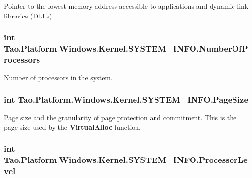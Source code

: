 Pointer to the lowest memory address accessible to applications and dynamic-\/link libraries (DLLs). 

\hypertarget{struct_tao_1_1_platform_1_1_windows_1_1_kernel_1_1_s_y_s_t_e_m___i_n_f_o_a0ac7829baa6c9870245d5ce59d539356}{
\subsubsection[{NumberOfProcessors}]{\setlength{\rightskip}{0pt plus 5cm}int {\bf Tao.Platform.Windows.Kernel.SYSTEM\_\-INFO.NumberOfProcessors}}}
\label{struct_tao_1_1_platform_1_1_windows_1_1_kernel_1_1_s_y_s_t_e_m___i_n_f_o_a0ac7829baa6c9870245d5ce59d539356}


Number of processors in the system. 

\hypertarget{struct_tao_1_1_platform_1_1_windows_1_1_kernel_1_1_s_y_s_t_e_m___i_n_f_o_a5c72c40ccfdf4070f7ed58033db8c892}{
\subsubsection[{PageSize}]{\setlength{\rightskip}{0pt plus 5cm}int {\bf Tao.Platform.Windows.Kernel.SYSTEM\_\-INFO.PageSize}}}
\label{struct_tao_1_1_platform_1_1_windows_1_1_kernel_1_1_s_y_s_t_e_m___i_n_f_o_a5c72c40ccfdf4070f7ed58033db8c892}


Page size and the granularity of page protection and commitment. This is the page size used by the {\bfseries VirtualAlloc} function. 

\hypertarget{struct_tao_1_1_platform_1_1_windows_1_1_kernel_1_1_s_y_s_t_e_m___i_n_f_o_a52a0d3b28f7fc40b45377a30f13ebebe}{
\subsubsection[{ProcessorLevel}]{\setlength{\rightskip}{0pt plus 5cm}int {\bf Tao.Platform.Windows.Kernel.SYSTEM\_\-INFO.ProcessorLevel}}}
\label{struct_tao_1_1_platform_1_1_windows_1_1_kernel_1_1_s_y_s_t_e_m___i_n_f_o_a52a0d3b28f7fc40b45377a30f13ebebe}


